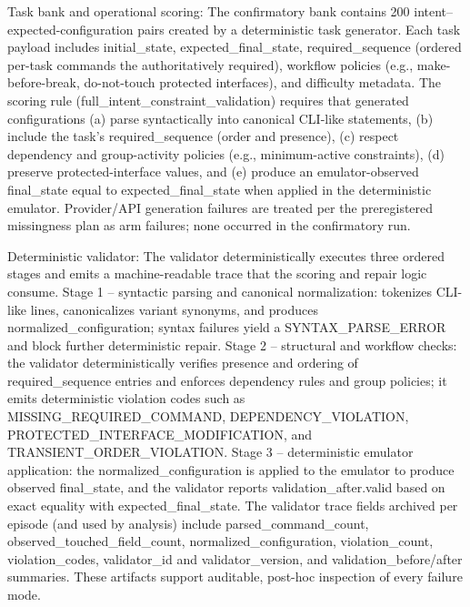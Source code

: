 \documentclass[conference]{IEEEtran}
\begin{document}
Task bank and operational scoring: The confirmatory bank contains 200 intent--expected-configuration pairs created by a deterministic task generator. Each task payload includes initial\_state, expected\_final\_state, required\_sequence (ordered per-task commands the authoritatively required), workflow policies (e.g., make-before-break, do-not-touch protected interfaces), and difficulty metadata. The scoring rule (full\_intent\_constraint\_validation) requires that generated configurations (a) parse syntactically into canonical CLI-like statements, (b) include the task's required\_sequence (order and presence), (c) respect dependency and group-activity policies (e.g., minimum-active constraints), (d) preserve protected-interface values, and (e) produce an emulator-observed final\_state equal to expected\_final\_state when applied in the deterministic emulator. Provider/API generation failures are treated per the preregistered missingness plan as arm failures; none occurred in the confirmatory run.

Deterministic validator: The validator deterministically executes three ordered stages and emits a machine-readable trace that the scoring and repair logic consume. Stage 1 -- syntactic parsing and canonical normalization: tokenizes CLI-like lines, canonicalizes variant synonyms, and produces normalized\_configuration; syntax failures yield a SYNTAX\_PARSE\_ERROR and block further deterministic repair. Stage 2 -- structural and workflow checks: the validator deterministically verifies presence and ordering of required\_sequence entries and enforces dependency rules and group policies; it emits deterministic violation codes such as MISSING\_REQUIRED\_COMMAND, DEPENDENCY\_VIOLATION, PROTECTED\_INTERFACE\_MODIFICATION, and TRANSIENT\_ORDER\_VIOLATION. Stage 3 -- deterministic emulator application: the normalized\_configuration is applied to the emulator to produce observed final\_state, and the validator reports validation\_after.valid based on exact equality with expected\_final\_state. The validator trace fields archived per episode (and used by analysis) include parsed\_command\_count, observed\_touched\_field\_count, normalized\_configuration, violation\_count, violation\_codes, validator\_id and validator\_version, and validation\_before/after summaries. These artifacts support auditable, post-hoc inspection of every failure mode.
\end{document}
